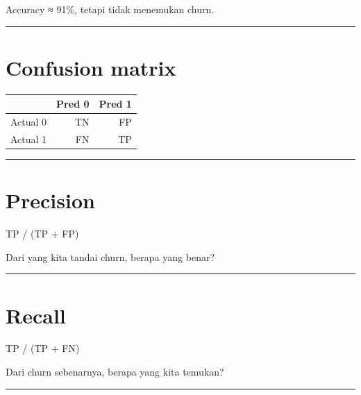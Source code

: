 \documentclass[
  indonesian,
  letterpaper,
  DIV=11,
  numbers=noendperiod]{scrreprt}
\newenvironment{Shaded}{\begin{snugshade}}{\end{snugshade}}
\newcommand{\NormalTok}[1]{\textcolor[rgb]{0.00,0.23,0.31}{#1}}
\newcounter{none} %
\begin{document}
Accuracy ≈ 91\%, tetapi tidak menemukan churn.

\begin{center}\rule{0.5\linewidth}{0.5pt}\end{center}

\section{Confusion matrix}\label{confusion-matrix}

{\def\LTcaptype{none} %
\begin{longtable}[]{@{}lrr@{}}
\toprule\noalign{}
& Pred 0 & Pred 1 \\
\midrule\noalign{}
\endhead
\bottomrule\noalign{}
\endlastfoot
Actual 0 & TN & FP \\
Actual 1 & FN & TP \\
\end{longtable}
}

\begin{center}\rule{0.5\linewidth}{0.5pt}\end{center}

\section{Precision}\label{precision}

\begin{Shaded}
\begin{Highlighting}[]
\NormalTok{TP / (TP + FP)}
\end{Highlighting}
\end{Shaded}

Dari yang kita tandai churn, berapa yang benar?

\begin{center}\rule{0.5\linewidth}{0.5pt}\end{center}

\section{Recall}\label{recall}

\begin{Shaded}
\begin{Highlighting}[]
\NormalTok{TP / (TP + FN)}
\end{Highlighting}
\end{Shaded}

Dari churn sebenarnya, berapa yang kita temukan?

\begin{center}\rule{0.5\linewidth}{0.5pt}\end{center}
\end{document}
